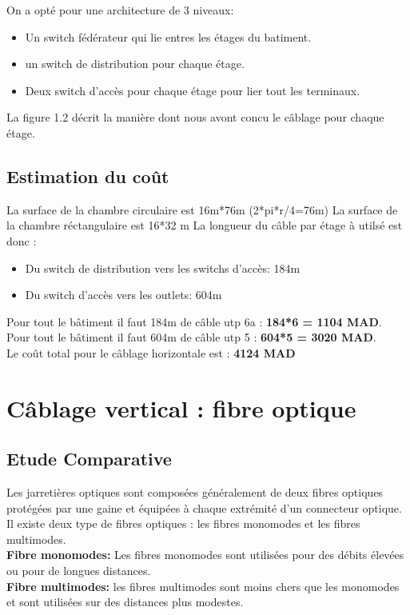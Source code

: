 \documentclass[12pt,a4paper]{report}
\begin{document}
		On a opté pour une architecture de 3 niveaux:
		\begin{itemize}
			\item Un switch fédérateur qui lie entres les étages du batiment.
			\item un switch de distribution pour chaque étage.
			\item Deux switch d'accès pour chaque étage pour lier tout les terminaux.
		\end{itemize}
		
		La figure 1.2 décrit la manière dont nous avont concu le câblage pour chaque étage.
		
		
		\subsection{Estimation du coût}

			La surface de la chambre circulaire est 16m*76m (2*pi*r/4=76m)
			La surface de la chambre réctangulaire est 16*32 m
			La longueur du câble par étage à utilsé est donc :
			\begin{itemize}
				\item Du switch de distribution vers les switchs d'accès: 184m
				\item Du switch d'accès vers les outlets: 604m
			\end{itemize}
			Pour tout le bâtiment il faut 184m de câble \ac{utp} 6a :
				\textbf{184*6 = 1104 MAD}.\\
			Pour tout le bâtiment il faut 604m de câble \ac{utp} 5 :
				\textbf{604*5 = 3020 MAD}.\\
			Le coût total pour le câblage horizontale est : \textbf{4124 MAD}
		\newpage










		\section{Câblage vertical : fibre optique}
		
		\subsection{Etude Comparative}
			Les jarretières optiques sont composées généralement de deux fibres optiques protégées par
une gaine et équipées à chaque extrémité d’un connecteur optique. Il existe deux type de
fibres optiques : les fibres monomodes et les fibres multimodes.\\
			\textbf{Fibre monomodes: } Les fibres monomodes sont utilisées pour des débits élevées
ou pour de longues distances.\\
			\textbf{Fibre multimodes: }  les fibres multimodes sont moins chers que les
monomodes et sont utilisées sur des distances plus modestes.
\end{document}

